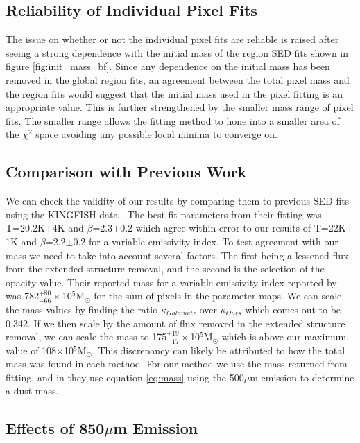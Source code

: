 \subsection{Reliability of Individual Pixel Fits}

The issue on whether or not the individual pixel fits are reliable is raised after seeing a strong dependence with the initial mass of the region SED fits shown in figure \ref{fig:init_mass_bf}.  Since any dependence on the initial mass has been removed in the global region fits, an agreement between the total pixel mass and the region fits would suggest that the initial mass used in the pixel fitting is an appropriate value.  This is further strengthened by the smaller mass range of pixel fits.  The smaller range allows the fitting method to hone into a smaller area of the $\chi^2$ space avoiding any possible local minima to converge on.

\subsection{Comparison with Previous Work}

We can check the validity of our results by comparing them to previous SED fits using the KINGFISH data \citep{galametz2012}.  The best fit parameters from their fitting was T=20.2K$\pm$4K and $\beta$=2.3$\pm$0.2 which agree within error to our results of T=22K$\pm$1K and $\beta$=2.2$\pm$0.2 for a variable emissivity index.  To test agreement with our mass we need to take into account several factors.  The first being a lessened flux from the extended structure removal, and the second is the selection of the opacity value.  Their reported mass for a variable emissivity index reported by \cite{galametz2012} was 782$^{+80}_{-66}\times$10$^5$M$_\odot$ for the sum of pixels in the parameter maps.  We can scale the mass values by finding the ratio $\kappa_{Galametz}$ over $\kappa_{Ours}$ which comes out to be 0.342.  If we then scale by the amount of flux removed in the extended structure removal, we can scale the mass to 175$^{+19}_{-17}\times$10$^5$M$_\odot$ which is above our maximum value of 108$\times$10$^5$M$_\odot$.  This discrepancy can likely be attributed to how the total mass was found in each method.  For our method we use the mass returned from fitting, and in \cite{galametz2012} they use equation \ref{eq:mass} using the 500$\mu$m emission to determine a dust mass.

\subsection{Effects of 850$\mu$m Emission}



